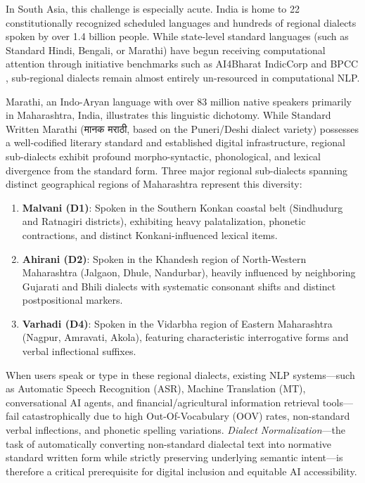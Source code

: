 In South Asia, this challenge is especially acute. India is home to 22 constitutionally recognized scheduled languages and hundreds of regional dialects spoken by over 1.4 billion people. While state-level standard languages (such as Standard Hindi, Bengali, or Marathi) have begun receiving computational attention through initiative benchmarks such as AI4Bharat IndicCorp and BPCC \cite{dabre2022indicbart}, sub-regional dialects remain almost entirely un-resourced in computational NLP.

Marathi, an Indo-Aryan language with over 83 million native speakers primarily in Maharashtra, India, illustrates this linguistic dichotomy. While Standard Written Marathi (मानक मराठी, based on the Puneri/Deshi dialect variety) possesses a well-codified literary standard and established digital infrastructure, regional sub-dialects exhibit profound morpho-syntactic, phonological, and lexical divergence from the standard form. Three major regional sub-dialects spanning distinct geographical regions of Maharashtra represent this diversity:
\begin{enumerate}
    \item \textbf{Malvani (D1)}: Spoken in the Southern Konkan coastal belt (Sindhudurg and Ratnagiri districts), exhibiting heavy palatalization, phonetic contractions, and distinct Konkani-influenced lexical items.
    \item \textbf{Ahirani (D2)}: Spoken in the Khandesh region of North-Western Maharashtra (Jalgaon, Dhule, Nandurbar), heavily influenced by neighboring Gujarati and Bhili dialects with systematic consonant shifts and distinct postpositional markers.
    \item \textbf{Varhadi (D4)}: Spoken in the Vidarbha region of Eastern Maharashtra (Nagpur, Amravati, Akola), featuring characteristic interrogative forms and verbal inflectional suffixes.
\end{enumerate}

When users speak or type in these regional dialects, existing NLP systems---such as Automatic Speech Recognition (ASR), Machine Translation (MT), conversational AI agents, and financial/agricultural information retrieval tools---fail catastrophically due to high Out-Of-Vocabulary (OOV) rates, non-standard verbal inflections, and phonetic spelling variations. \textit{Dialect Normalization}---the task of automatically converting non-standard dialectal text into normative standard written form while strictly preserving underlying semantic intent---is therefore a critical prerequisite for digital inclusion and equitable AI accessibility.

